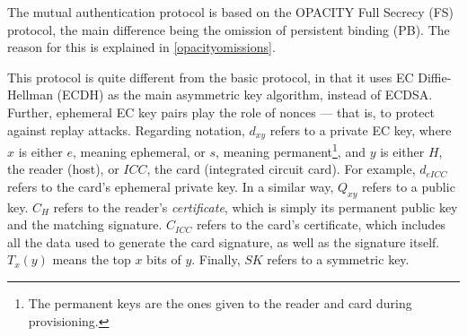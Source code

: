 \documentclass[12pt,a4paper,twoside,openright]{report}
\begin{document}
The mutual authentication protocol is based on the OPACITY \cite{OPACITY} Full Secrecy (FS) protocol, the main difference being the omission of persistent binding (PB). The reason for this is explained in \autoref{opacityomissions}.

This protocol is quite different from the basic protocol, in that it uses EC Diffie-Hellman (ECDH) as the main asymmetric key algorithm, instead of ECDSA. Further, ephemeral EC key pairs play the role of nonces --- that is, to protect against replay attacks. Regarding notation, $d_{xy}$ refers to a private EC key, where $x$ is either $e$, meaning ephemeral, or $s$, meaning permanent\footnote{The permanent keys are the ones given to the reader and card during provisioning.}, and $y$ is either $H$, the reader (host), or $ICC$, the card (integrated circuit card). For example, $d_{eICC}$ refers to the card's ephemeral private key. In a similar way, $Q_{xy}$ refers to a public key. $C_{H}$ refers to the reader's \emph{certificate}, which is simply its permanent public key and the matching signature. $C_{ICC}$ refers to the card's certificate, which includes all the data used to generate the card signature, as well as the signature itself. $T_x(y)$ means the top $x$ bits of $y$. Finally, $SK$ refers to a symmetric key.
\end{document}
